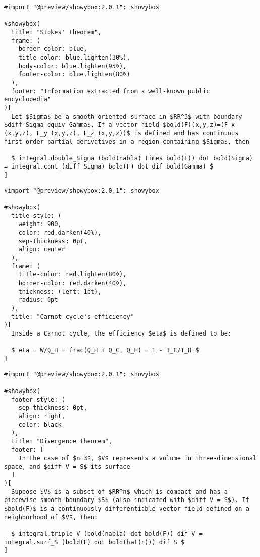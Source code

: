 \pandocbounded{}

\begin{verbatim}
#import "@preview/showybox:2.0.1": showybox

#showybox(
  title: "Stokes' theorem",
  frame: (
    border-color: blue,
    title-color: blue.lighten(30%),
    body-color: blue.lighten(95%),
    footer-color: blue.lighten(80%)
  ),
  footer: "Information extracted from a well-known public encyclopedia"
)[
  Let $Sigma$ be a smooth oriented surface in $RR^3$ with boundary $diff Sigma equiv Gamma$. If a vector field $bold(F)(x,y,z)=(F_x (x,y,z), F_y (x,y,z), F_z (x,y,z))$ is defined and has continuous first order partial derivatives in a region containing $Sigma$, then

  $ integral.double_Sigma (bold(nabla) times bold(F)) dot bold(Sigma) = integral.cont_(diff Sigma) bold(F) dot dif bold(Gamma) $
]
\end{verbatim}

\pandocbounded{}

\begin{verbatim}
#import "@preview/showybox:2.0.1": showybox

#showybox(
  title-style: (
    weight: 900,
    color: red.darken(40%),
    sep-thickness: 0pt,
    align: center
  ),
  frame: (
    title-color: red.lighten(80%),
    border-color: red.darken(40%),
    thickness: (left: 1pt),
    radius: 0pt
  ),
  title: "Carnot cycle's efficiency"
)[
  Inside a Carnot cycle, the efficiency $eta$ is defined to be:

  $ eta = W/Q_H = frac(Q_H + Q_C, Q_H) = 1 - T_C/T_H $
]
\end{verbatim}

\pandocbounded{}

\begin{verbatim}
#import "@preview/showybox:2.0.1": showybox

#showybox(
  footer-style: (
    sep-thickness: 0pt,
    align: right,
    color: black
  ),
  title: "Divergence theorem",
  footer: [
    In the case of $n=3$, $V$ represents a volume in three-dimensional space, and $diff V = S$ its surface
  ]
)[
  Suppose $V$ is a subset of $RR^n$ which is compact and has a piecewise smooth boundary $S$ (also indicated with $diff V = S$). If $bold(F)$ is a continuously differentiable vector field defined on a neighborhood of $V$, then:

  $ integral.triple_V (bold(nabla) dot bold(F)) dif V = integral.surf_S (bold(F) dot bold(hat(n))) dif S $
]
\end{verbatim}

